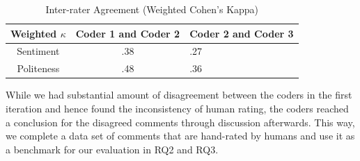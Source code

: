 \vspace{3mm}
\noindent{}
\vspace{3mm}


\begin{table}
\centering
\caption{Inter-rater Agreement (Weighted Cohen's Kappa)}
  \label{interrater}
  \begin{tabular}{|c|c|l|}
    \toprule
    Weighted $\kappa$ & Coder 1 and Coder 2 &  Coder 2 and  Coder 3\\
    \midrule
    Sentiment & .38 & .27 \\
    \hline
    Politeness & .48 & .36\\
  \bottomrule
\end{tabular}
\end{table}

While we had substantial amount of disagreement 
between the coders in the first iteration 
and hence found the inconsistency of human rating, 
the coders reached a conclusion for the disagreed comments 
through discussion afterwards. 
This way, we complete a data set of comments 
that are hand-rated by humans and 
use it as a benchmark for our evaluation in RQ2 and RQ3.

